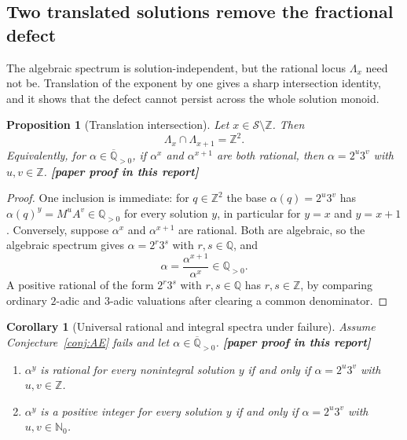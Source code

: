 \documentclass[11pt,oneside]{article}
\newtheorem{proposition}[theorem]{Proposition}
\newtheorem{corollary}[theorem]{Corollary}
\theoremstyle{definition}
\theoremstyle{remark}
\newcommand{\Nzero}{\mathbb N_0}
\newcommand{\Z}{\mathbb Z}
\newcommand{\Q}{\mathbb Q}
\newcommand{\Abar}{\overline{\mathbb Q}}
\newcommand{\Sol}{\mathcal S}
\newcommand{\Apos}{\Abar_{>0}}
\newcommand{\statusnew}{\textcolor{newgreen}{\textbf{[paper proof in this report]}}}
\begin{document}
\subsection{Two translated solutions remove the fractional defect}

The algebraic spectrum is solution-independent, but the rational locus $\Lambda_x$ need not
be.  Translation of the exponent by one gives a sharp intersection identity, and it shows that
the defect cannot persist across the whole solution monoid.

\begin{proposition}[Translation intersection]
\label{vl:prop-translation}
Let $x\in\Sol\setminus\Z$.  Then
\[
  \Lambda_x\cap\Lambda_{x+1}=\Z^2 .
\]
Equivalently, for $\alpha\in\Apos$, if $\alpha^x$ and $\alpha^{x+1}$ are both rational, then
$\alpha=2^u3^v$ with $u,v\in\Z$.  \statusnew
\end{proposition}

\begin{proof}
One inclusion is immediate: for $q\in\Z^2$ the base $\alpha(q)=2^u3^v$ has
$\alpha(q)^y=M^uA^v\in\Q_{>0}$ for every solution $y$, in particular for $y=x$ and $y=x+1$.
Conversely, suppose $\alpha^x$ and $\alpha^{x+1}$ are rational.  Both are algebraic, so the
algebraic spectrum gives $\alpha=2^r3^s$ with $r,s\in\Q$, and
\[
  \alpha=\frac{\alpha^{x+1}}{\alpha^x}\in\Q_{>0}.
\]
A positive rational of the form $2^r3^s$ with $r,s\in\Q$ has $r,s\in\Z$, by comparing ordinary
$2$-adic and $3$-adic valuations after clearing a common denominator.
\end{proof}

\begin{corollary}[Universal rational and integral spectra under failure]
\label{vl:cor-universal}
Assume Conjecture~\ref{conj:AE} fails and let $\alpha\in\Apos$.  \statusnew
\begin{enumerate}
\item $\alpha^y$ is rational for every nonintegral solution $y$ if and only if
      $\alpha=2^u3^v$ with $u,v\in\Z$.
\item $\alpha^y$ is a positive integer for every solution $y$ if and only if
      $\alpha=2^u3^v$ with $u,v\in\Nzero$.
\end{enumerate}
\end{corollary}
\end{document}
